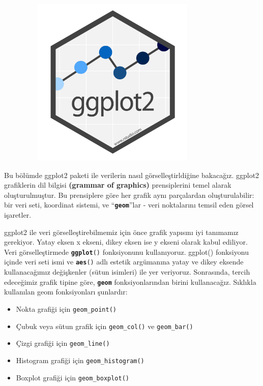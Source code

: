 \documentclass[
  letterpaper,
  DIV=11,
  numbers=noendperiod]{scrreprt}
\begin{document}
\begin{center}
\includegraphics[width=4.4375in,height=3.20833in]{images/ggplot2.png}
\end{center}

Bu bölümde ggplot2 paketi ile verilerin nasıl görselleştirldiğine
bakacağız. ggplot2 grafiklerin dil bilgisi \textbf{(grammar of
graphics)} prensiplerini temel alarak oluşturulmuştur. Bu prensiplere
göre her grafik aynı parçalardan oluşturulabilir: bir veri seti,
koordinat sistemi, ve ``\textbf{\texttt{geom}}''lar - veri noktalarını
temsil eden görsel işaretler.

ggplot2 ile veri görselleştirebilmemiz için önce grafik yapısını iyi
tanımamız gerekiyor. Yatay eksen x ekseni, dikey eksen ise y ekseni
olarak kabul ediliyor. Veri görselleştirmede
\textbf{\texttt{ggplot}}\texttt{()} fonksiyonunu kullanıyoruz. ggplot()
fonksiyonu içinde veri seti ismi ve \textbf{\texttt{aes}}\texttt{()}
adlı estetik argümanına yatay ve dikey eksende kullanacağımız
değişkenler (sütun isimleri) ile yer veriyoruz. Sonrasında, tercih
edeceğimiz grafik tipine göre, \textbf{\texttt{geom}} fonksiyonlarından
birini kullanacağız. Sıklıkla kullanılan geom fonksiyonları şunlardır:

\begin{itemize}
\item
  Nokta grafiği için \texttt{geom\_point()}
\item
  Çubuk veya sütun grafik için \texttt{geom\_col()} ve
  \texttt{geom\_bar()}
\item
  Çizgi grafiği için \texttt{geom\_line()}
\item
  Histogram grafiği için \texttt{geom\_histogram()}
\item
  Boxplot grafiği için \texttt{geom\_boxplot()}
\end{itemize}
\end{document}
